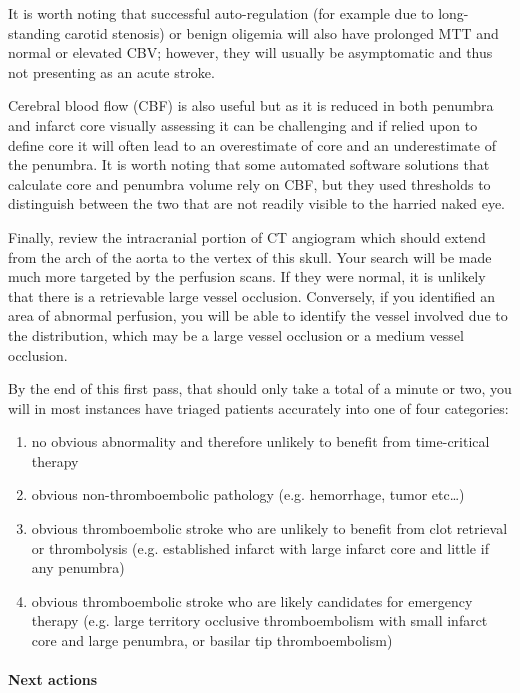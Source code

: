 It is worth noting that successful auto-regulation (for example due to long-standing carotid stenosis) or benign oligemia will also have prolonged MTT and normal or elevated CBV; however, they will usually be asymptomatic and thus not presenting as an acute stroke.

Cerebral blood flow (CBF) is also useful but as it is reduced in both penumbra and infarct core visually assessing it can be challenging and if relied upon to define core it will often lead to an overestimate of core and an underestimate of the penumbra. It is worth noting that some automated software solutions that calculate core and penumbra volume rely on CBF, but they used thresholds to distinguish between the two that are not readily visible to the harried naked eye.

Finally, review the intracranial portion of CT angiogram which should extend from the arch of the aorta to the vertex of this skull. Your search will be made much more targeted by the perfusion scans. If they were normal, it is unlikely that there is a retrievable large vessel occlusion. Conversely, if you identified an area of abnormal perfusion, you will be able to identify the vessel involved due to the distribution, which may be a large vessel occlusion or a medium vessel occlusion.

By the end of this first pass, that should only take a total of a minute or two, you will in most instances have triaged patients accurately into one of four categories:

\begin{enumerate}
	\item
	no obvious abnormality and therefore unlikely to benefit from time-critical therapy
	\item
	obvious non-thromboembolic pathology (e.g. hemorrhage, tumor etc\ldots)
	\item
	obvious thromboembolic stroke who are unlikely to benefit from clot retrieval or thrombolysis (e.g. established infarct with large infarct core and little if any penumbra)
	\item
	obvious thromboembolic stroke who are likely candidates for emergency therapy (e.g. large territory occlusive thromboembolism with small infarct core and large penumbra, or basilar tip thromboembolism)
\end{enumerate}

\paragraph{Next actions}

